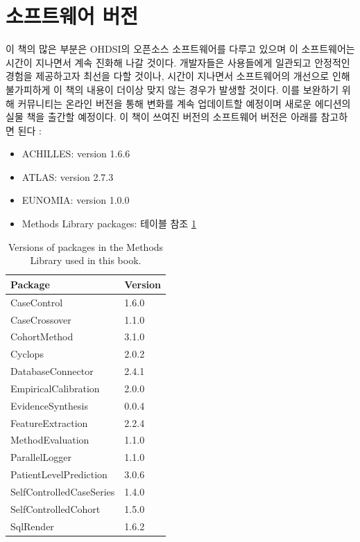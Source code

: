 \documentclass[11pt]{book}
\providecommand{\tightlist}{%
  \setlength{\itemsep}{0pt}\setlength{\parskip}{0pt}}
\theoremstyle{definition}
\theoremstyle{definition}
\theoremstyle{definition}
\theoremstyle{remark}
\begin{document}
\section*{소프트웨어 버전}\label{-}

이 책의 많은 부분은 OHDSI의 오픈소스 소프트웨어를 다루고 있으며 이
소프트웨어는 시간이 지나면서 계속 진화해 나갈 것이다. 개발자들은
사용들에게 일관되고 안정적인 경험을 제공하고자 최선을 다할 것이나,
시간이 지나면서 소프트웨어의 개선으로 인해 불가피하게 이 책의 내용이
더이상 맞지 않는 경우가 발생할 것이다. 이를 보완하기 위해 커뮤니티는
온라인 버전을 통해 변화를 계속 업데이트할 예정이며 새로운 에디션의 실물
책을 출간할 예정이다. 이 책이 쓰여진 버전의 소프트웨어 버전은 아래를
참고하면 된다 :

\begin{itemize}
\tightlist
\item
  ACHILLES: version 1.6.6
\item
  ATLAS: version 2.7.3
\item
  EUNOMIA: version 1.0.0
\item
  Methods Library packages: 테이블 참조 \ref{tab:packageVersions}
\end{itemize}

\begin{table}[t]

\caption{\label{tab:packageVersions}Versions of packages in the Methods Library used in this book.}
\centering
\begin{tabular}{ll}
\toprule
Package & Version\\
\midrule
CaseControl & 1.6.0\\
CaseCrossover & 1.1.0\\
CohortMethod & 3.1.0\\
Cyclops & 2.0.2\\
DatabaseConnector & 2.4.1\\
\addlinespace
EmpiricalCalibration & 2.0.0\\
EvidenceSynthesis & 0.0.4\\
FeatureExtraction & 2.2.4\\
MethodEvaluation & 1.1.0\\
ParallelLogger & 1.1.0\\
\addlinespace
PatientLevelPrediction & 3.0.6\\
SelfControlledCaseSeries & 1.4.0\\
SelfControlledCohort & 1.5.0\\
SqlRender & 1.6.2\\
\bottomrule
\end{tabular}
\end{table}
\end{document}

